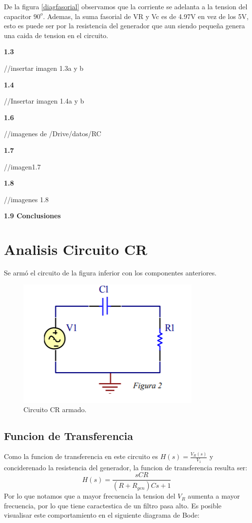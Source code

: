 De la figura \ref{diagfasorial} observamos que la corriente se adelanta a la tension
del capacitor $90^{o}$. Ademas, la suma fasorial de VR y Vc es de
4.97V en vez de los 5V, esto es puede ser por la resistencia del generador
que aun siendo pequeña genera una caida de tension en el circuito.

\textbf{1.3}

//insertar imagen 1.3a y b

\textbf{1.4}

//Insertar imagen 1.4a y b

\textbf{1.6}

//imagenes de /Drive/datos/RC

\textbf{1.7}

//imagen1.7

\textbf{1.8}

//imagenes 1.8

\textbf{1.9 Conclusiones}



\section{Analisis Circuito CR}

Se armó el circuito de la figura inferior con los componentes anteriores.

\begin{figure}[h!]
\centering
\includegraphics[scale=0.5]{crCircuito.png}
\caption{Circuito CR armado.}
\label{fig:CR}
\end{figure}


\subsection{Funcion de Transferencia}

Como la funcion de transferencia en este circuito es $H(s) = \frac{V_R(s)}{V_1}$ y conciderenado la resistencia del generador, la funcion de transferencia resulta ser:
$$H(s) = \frac{sCR}{\left(R+R_{gen}\right)Cs+1}$$
Por lo que notamos que a mayor frecuencia la tension del $V_R$ aumenta a mayor frecuencia, por lo que tiene caractestica de un filtro pasa alto. Es posible visualisar este comportamiento en el siguiente diagrama de Bode:

